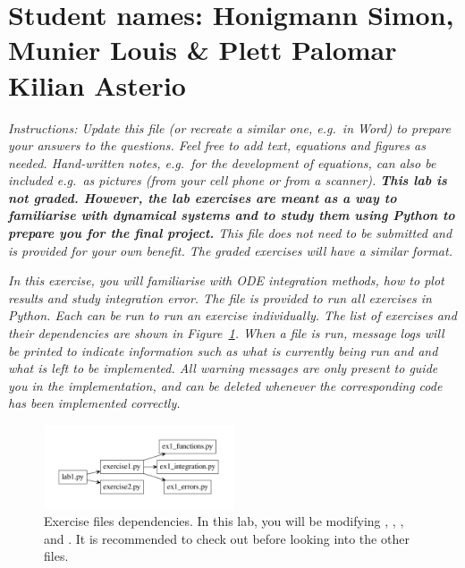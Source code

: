 \documentclass{cmc}
\begin{document}
\pagestyle{fancy}
 

\section*{Student names: Honigmann Simon, Munier Louis \& Plett Palomar Kilian Asterio}

\textit{Instructions: Update this file (or recreate a similar one, e.g.\ in
  Word) to prepare your answers to the questions. Feel free to add text,
  equations and figures as needed. Hand-written notes, e.g.\ for the development
  of equations, can also be included e.g.\ as pictures (from your cell phone or
  from a scanner).  \textbf{This lab is not graded. However, the lab exercises
    are meant as a way to familiarise with dynamical systems and to study them
    using Python to prepare you for the final project.} This file does not need
  to be submitted and is provided for your own benefit. The graded exercises
  will have a similar format.}

\textit{In this exercise, you will familiarise with ODE integration methods, how
  to plot results and study integration error. The file  is
  provided to run all exercises in Python. Each  can be
  run to run an exercise individually. The list of exercises and their
  dependencies are shown in Figure~\ref{fig:files}. When a file is run, message
  logs will be printed to indicate information such as what is currently being
  run and and what is left to be implemented. All warning messages are only
  present to guide you in the implementation, and can be deleted whenever the
  corresponding code has been implemented correctly.}

\begin{figure}[ht]
  \centering \includegraphics[width=0.5\textwidth]{figures/files}
  \caption{\label{fig:files} Exercise files dependencies. In this lab, you will
    be modifying , ,
    , and
    . It is recommended to check out
     before looking into the other 
    files.}
\end{figure}
\end{document}
